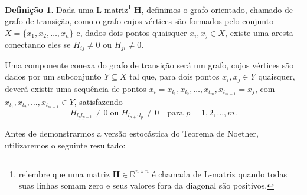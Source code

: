 \documentclass[twoside,openright,titlepage,numbers=noenddot,headinclude,  lineheaders footinclude=true,cleardoublepage=empty,
                                BCOR=5mm,paper=a4,fontsize=12pt ]{scrbook}
\theoremstyle{definition}
\newtheorem{definicao}{Definição}[chapter]
\begin{document}

\begin{definicao}
Dada uma L-matriz\footnote{ relembre que uma matriz $\bm{H} \in \mathbb{R}^{n \times n}$
é  chamada de L-matriz quando todas suas linhas somam zero e seus
valores fora da diagonal são positivos.} %
 $\bm{H}$, definimos o grafo orientado, chamado de grafo de
transição, como o grafo cujos vértices são formados pelo
conjunto $X = \{x_1, x_2, \ldots, x_n \}$ e, dados dois pontos quaisquer $x_i, x_j \in X$, existe uma aresta conectando eles se
$H_{ij} \neq 0$
ou $H_{ji} \neq 0$. 
\end{definicao}

Uma componente conexa do grafo de transição
será um grafo, cujos vértices são dados por um subconjunto
$Y \subseteq X$ tal que, para dois pontos $x_i, x_j \in Y$ quaisquer, deverá
existir
uma sequência de pontos $x_i = x_{l_1}, x_{l_2}, \ldots, x_{l_m}, 
x_{l_{m+1}} = x_j$,
com $x_{l_1}, x_{l_2}, \ldots, x_{l_{m+1}} \in Y$,  satisfazendo
\[
H_{l_pl_{p+1}} \neq 0 \; \text{ou} \; H_{l_{p+1}l_p} \neq 0
\quad \text{para } p = 1, 2, \ldots, m.
\]


Antes de demonstrarmos a versão estocástica do Teorema de Noether, 
utilizaremos o seguinte resultado:
\end{document}
